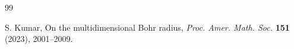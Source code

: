 \documentclass[a4paper,12pt]{amsart}
\theoremstyle{definition}
\begin{document}
\begin{thebibliography}{99}
	
	
	 {\sc S. Kumar}, On the multidimensional Bohr radius, {\it Proc. Amer. Math. Soc.} {\bf 151} (2023), 2001--2009.
	
	
	
	
	
	
	
	
	
	

\end{thebibliography}
\end{document}
